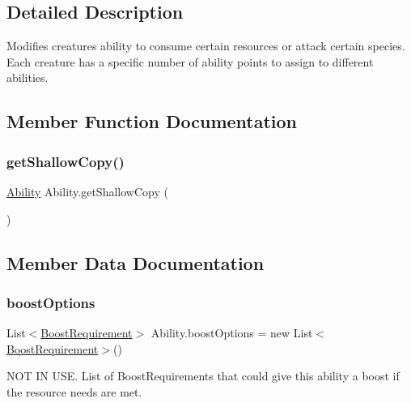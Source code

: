 \subsection{Detailed Description}
Modifies creature\textquotesingle{}s ability to consume certain resources or attack certain species. Each creature has a specific number of ability points to assign to different abilities. 



\subsection{Member Function Documentation}
\mbox{\label{class_ability_a633ef57f5e0584a5b28317f790300f7a}} 
\subsubsection{\texorpdfstring{get\+Shallow\+Copy()}{getShallowCopy()}}
{\footnotesize\ttfamily \mbox{\hyperlink{class_ability}{Ability}} Ability.\+get\+Shallow\+Copy (\begin{DoxyParamCaption}{ }\end{DoxyParamCaption})}



\subsection{Member Data Documentation}
\mbox{\label{class_ability_ab17185b55f3574f64729cb530848bb97}} 
\subsubsection{\texorpdfstring{boost\+Options}{boostOptions}}
{\footnotesize\ttfamily List$<$\mbox{\hyperlink{class_boost_requirement}{Boost\+Requirement}}$>$ Ability.\+boost\+Options = new List$<$\mbox{\hyperlink{class_boost_requirement}{Boost\+Requirement}}$>$()}



N\+OT IN U\+SE. List of Boost\+Requirements that could give this ability a boost if the resource needs are met. 

\mbox{\label{class_ability_ad7432e0f8cd20857bbc8ff8da0f405c6}} 
